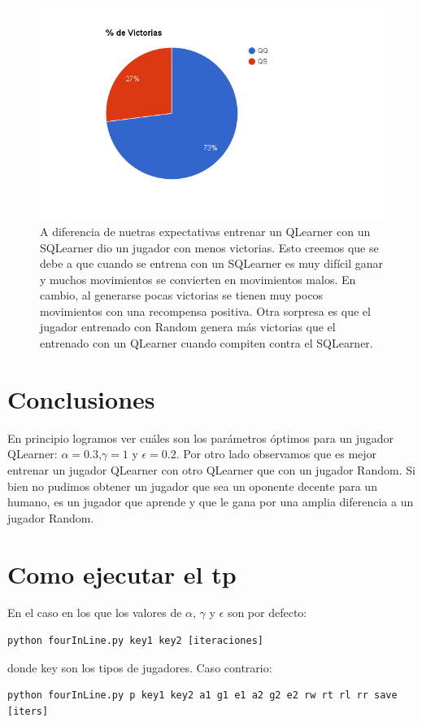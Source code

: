 \documentclass[10pt, a4paper]{article}
\begin{document}
\begin{figure}[H]
\begin{minipage}[c]{1\textwidth}
  \includegraphics[scale=0.3]{QQvsQS.png}
  \caption{A diferencia de nuetras expectativas entrenar un QLearner con un SQLearner dio un jugador con menos victorias. Esto creemos que se debe a que cuando se entrena con un SQLearner es muy difícil ganar y muchos movimientos se convierten en movimientos malos. En cambio, al generarse pocas victorias se tienen muy pocos movimientos con una recompensa positiva.
  Otra sorpresa es que el jugador entrenado con Random genera más victorias que el entrenado con un QLearner cuando compiten contra el SQLearner.}
  \end{minipage}
\end{figure}



\section{Conclusiones}
En principio logramos ver cuáles son los parámetros óptimos para un jugador QLearner: $\alpha=0.3$,$\gamma=1$ y $\epsilon=0.2$.
Por otro lado observamos que es mejor entrenar un jugador QLearner con otro QLearner que con un jugador Random.
Si bien no pudimos obtener un jugador que sea un oponente decente para un humano, es un jugador que aprende y que le gana por una amplia diferencia a un jugador Random.


\section{Como ejecutar el tp}


En el caso en los que los valores de $\alpha$, $\gamma$ y $\epsilon$ son por defecto:
\begin{lstlisting}
python fourInLine.py key1 key2 [iteraciones]
\end{lstlisting}
donde key son los tipos de jugadores. Caso contrario: \\
\begin{lstlisting}
python fourInLine.py p key1 key2 a1 g1 e1 a2 g2 e2 rw rt rl rr save [iters]
\end{lstlisting}
\end{document}
